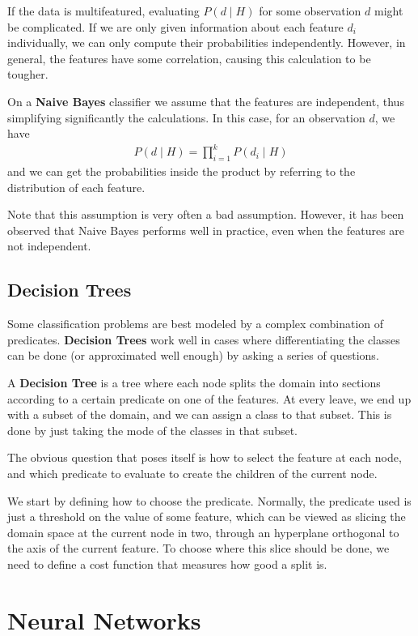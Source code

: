 \documentclass{article}
\begin{document}
If the data is multifeatured, evaluating $P(d \mid H)$ for some observation $d$ might be complicated.
If we are only given information about each feature $d_i$ individually, we can only compute their probabilities independently.
However, in general, the features have some correlation, causing this calculation to be tougher.

On a \textbf{Naive Bayes} classifier we assume that the features are independent, thus simplifying significantly the calculations.
In this case, for an observation $d$, we have
\begin{gather*}
P(d \mid H) = \prod_{i=1}^k P(d_i \mid H)
\end{gather*}
and we can get the probabilities inside the product by referring to the distribution of each feature.

Note that this assumption is very often a bad assumption.
However, it has been observed that Naive Bayes performs well in practice, even when the features are not independent.

\subsection{Decision Trees}

Some classification problems are best modeled by a complex combination of predicates.
\textbf{Decision Trees} work well in cases where differentiating the classes can be done (or approximated well enough) by asking a series of questions.

A \textbf{Decision Tree} is a tree where each node splits the domain into sections according to a certain predicate on one of the features.
At every leave, we end up with a subset of the domain, and we can assign a class to that subset.
This is done by just taking the mode of the classes in that subset.

The obvious question that poses itself is how to select the feature at each node, and which predicate to evaluate to create the children of the current node.

We start by defining how to choose the predicate.
Normally, the predicate used is just a threshold on the value of some feature, which can be viewed as slicing the domain space at the current node in two, through an hyperplane orthogonal to the axis of the current feature.
To choose where this slice should be done, we need to define a cost function that measures how good a split is.

\section{Neural Networks}
\end{document}
